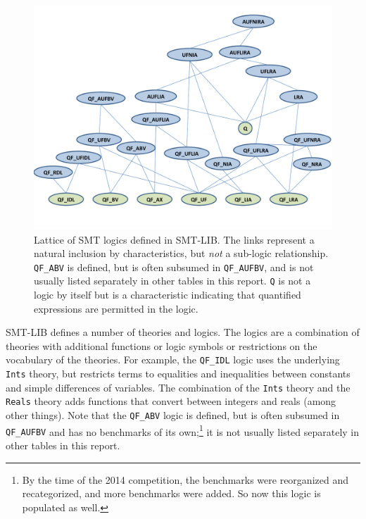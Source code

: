 \documentclass{eptcs}
\begin{document}
\begin{figure}
\centering
\includegraphics[width=\textwidth]{LogicLattice}
\caption{Lattice of SMT logics defined in SMT-LIB. The links represent a natural inclusion by characteristics, but {\it not} a sub-logic relationship. {\tt QF\_ABV} is defined, but is often subsumed in {\tt QF\_AUFBV}, and is not usually listed separately in other tables in this report. {\tt Q} is not a logic by itself but is a characteristic indicating that quantified expressions are permitted in the logic.}
\label{Fig:lattice}
\end{figure}

SMT-LIB defines a number of theories and logics. The logics are a combination of theories with additional functions or logic symbols or restrictions on the vocabulary of the theories. For example, the {\tt QF\_IDL} logic uses the underlying {\tt Ints} theory, but restricts terms to equalities and inequalities between constants and simple differences of variables.
The combination of the {\tt Ints} theory and the {\tt Reals} theory adds functions that convert between integers and reals (among other things). 
Note that the {\tt QF\_ABV} logic is defined, but is often subsumed in {\tt QF\_AUFBV} and has no benchmarks of its own;\footnote{By the time of the 2014 competition, the benchmarks were reorganized and recategorized, and more benchmarks were added. So now this logic is populated as well.} it is not usually listed separately in other tables in this report.
\end{document}
